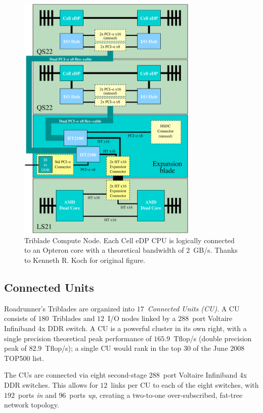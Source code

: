 \documentclass[journal,twoside]{IEEEtran}
\begin{document}
\begin{figure}
\begin{center}
\includegraphics[width=3.375in]{figs/triblade.eps}
\caption{Triblade Compute Node.  Each Cell eDP CPU is logically
connected to an Opteron core with a theoretical bandwidth of
$2$~GB/s.  Thanks to Kenneth R. Koch for original figure.}
\label{fig:triblade}
\end{center}
\end{figure}

\subsection{Connected Units}

Roadrunner's Triblades are organized into $17$~\emph{Connected Units
(CU)}.  A CU consists of $180$~Triblades and $12$~I/O nodes linked by
a $288$~port Voltaire Infiniband 4x DDR switch.  A CU is a powerful
cluster in its own right, with a single precision theoretical peak
performance of $165.9$~Tflop/s (double precision peak of
$82.9$~Tflop/s); a single CU would rank in the top $30$ of the June
2008 TOP500 list.

The CUs are connected via eight second-stage $288$~port Voltaire
Infiniband 4x DDR switches.  This allows for $12$~links per CU to each
of the eight switches, with $192$~ports \emph{in} and $96$~ports
\emph{up}, creating a two-to-one over-subscribed, fat-tree network
topology.
\end{document}
